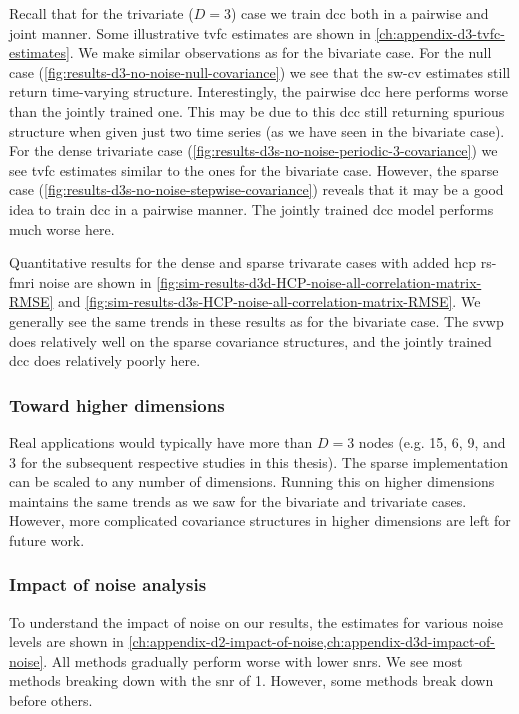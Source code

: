 Recall that for the trivariate ($D = 3$) case we train \gls{dcc} both in a pairwise and joint manner.
Some illustrative \gls{tvfc} estimates are shown in \cref{ch:appendix-d3-tvfc-estimates}.
We make similar observations as for the bivariate case.
For the null case (\cref{fig:results-d3-no-noise-null-covariance}) we see that the \gls{sw-cv} estimates still return time-varying structure.
Interestingly, the pairwise \gls{dcc} here performs worse than the jointly trained one.
This may be due to this \gls{dcc} still returning spurious structure when given just two time series (as we have seen in the bivariate case).
For the dense trivariate case (\cref{fig:results-d3s-no-noise-periodic-3-covariance}) we see \gls{tvfc} estimates similar to the ones for the bivariate case.
However, the sparse case (\cref{fig:results-d3s-no-noise-stepwise-covariance}) reveals that it may be a good idea to train \gls{dcc} in a pairwise manner.
The jointly trained \gls{dcc} model performs much worse here.

Quantitative results for the dense and sparse trivarate cases with added \gls{hcp} \gls{rs-fmri} noise are shown in \cref{fig:sim-results-d3d-HCP-noise-all-correlation-matrix-RMSE} and \cref{fig:sim-results-d3s-HCP-noise-all-correlation-matrix-RMSE}.
We generally see the same trends in these results as for the bivariate case.
The \gls{svwp} does relatively well on the sparse covariance structures, and the jointly trained \gls{dcc} does relatively poorly here.

\subsubsection{Toward higher dimensions}

Real applications would typically have more than $D = 3$ nodes (e.g. 15, 6, 9, and 3 for the subsequent respective studies in this thesis).
The sparse implementation can be scaled to any number of dimensions.
Running this on higher dimensions maintains the same trends as we saw for the bivariate and trivariate cases.
However, more complicated covariance structures in higher dimensions are left for future work.

\subsubsection{Impact of noise analysis}
\label{subsec:impact-of-noise-analysis}

To understand the impact of noise on our results, the estimates for various noise levels are shown in \cref{ch:appendix-d2-impact-of-noise,ch:appendix-d3d-impact-of-noise}.
All methods gradually perform worse with lower \glspl{snr}.
We see most methods breaking down with the \gls{snr} of 1.
However, some methods break down before others.

